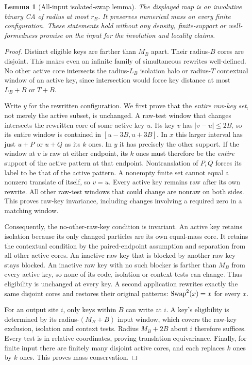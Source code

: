\documentclass[11pt,a4paper]{article}
\numberwithin{equation}{section}
\newtheorem{lemma}[theorem]{Lemma}
\begin{document}
\begin{lemma}[All-input isolated-swap lemma]\label{fpa:lem:swap}
The displayed map is an involutive binary CA of radius at most $r_B$. It
preserves numerical mass on every finite configuration. These statements hold
without any density, finite-support or well-formedness promise on the input
for the involution and locality claims.
\end{lemma}
\begin{proof}
Distinct eligible keys are farther than $M_B$ apart. Their radius-$B$ cores
are disjoint. This makes even an infinite family of simultaneous rewrites
well-defined. No other active core intersects the radius-$L_B$ isolation halo
or radius-$T$ contextual window of an active key, since intersection would
force key distance at most $L_B+B$ or $T+B$.

Write $y$ for the rewritten configuration. We first prove that the \emph{entire
raw-key set}, not merely the active subset, is unchanged. A raw-test window
that changes intersects the rewritten core of some active key $u$. Its key
$v$ has $|v-u|\le2B$, so its entire window is contained in
$[u-3B,u+3B]$. In $x$ this larger interval has just $u+P$ or $u+Q$ as its $k$
ones. In $y$ it has precisely the other support. If the window at $v$ is raw
at either endpoint, its $k$ ones must therefore be the \emph{entire} support
of the active pattern at that endpoint. Nontranslation of $P,Q$ forces its
label to be that of the active pattern. A nonempty finite set cannot equal a
nonzero translate of itself, so $v=u$. Every active key remains raw after
its own rewrite. All other raw-test windows that could change are nonraw on
both sides. This proves raw-key invariance, including changes involving a
required zero in a matching window.

Consequently, the no-other-raw-key condition is invariant. An active key
retains isolation because its only changed particles are its own equal-mass
core. It retains the contextual condition by the paired-endpoint assumption
and separation from all other active cores. An inactive raw key that is
blocked by another raw key stays blocked. An inactive raw key with no such
blocker is farther than $M_B$ from every active key, so none of its code,
isolation or context tests can change. Thus eligibility is unchanged at every
key. A second application rewrites exactly the same disjoint cores and
restores their original patterns: $\operatorname{Swap}^2(x)=x$ for every $x$.

For an output site $i$, only keys within $B$ can write at $i$. A key's
eligibility is determined by its radius-$(M_B+B)$ input window, which covers
the raw-key exclusion, isolation and context tests. Radius $M_B+2B$ about $i$
therefore suffices. Every test is in relative coordinates, proving translation
equivariance. Finally, for finite input there are finitely many disjoint active
cores, and each replaces $k$ ones by $k$ ones. This proves mass conservation.
\end{proof}
\end{document}
